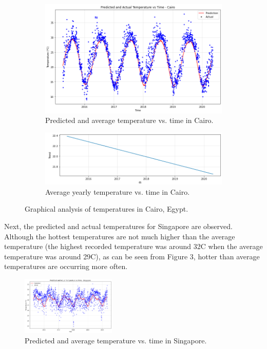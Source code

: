 \documentclass[11pt,a4paper,fleqn]{article}
\begin{document}
\begin{figure}[h]
     \centering
     \begin{subfigure}[b]{0.4\textwidth}
         \centering
         \includegraphics[width=\textwidth]{Cairo.png}
         \caption{Predicted and average temperature vs. time in Cairo.}
     \end{subfigure}
     \hfill
     \begin{subfigure}[b]{0.5\textwidth}
         \centering
         \includegraphics[width=\textwidth]{CairoComponents.png}
         \caption{Average yearly temperature vs. time in Cairo.}
     \end{subfigure}
     \caption{Graphical analysis of temperatures in Cairo, Egypt.}
\end{figure}

Next, the predicted and actual temperatures for Singapore are observed. Although the hottest temperatures are not much higher than the average temperature (the highest recorded temperature was around 32\textdegree C when the average temperature was around 29\textdegree C), as can be seen from Figure 3, hotter than average temperatures are occurring more often.


\begin{figure}[h]
    \centering
    \includegraphics[width=0.4\textwidth]{Singapore.png}
    \caption{\label{fig:graph}Predicted and average temperature vs. time in Singapore.}
\end{figure}
\end{document}
